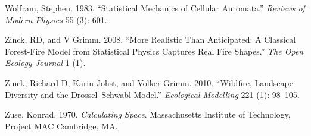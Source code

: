 \documentclass[
]{book}
\newlength{\cslhangindent}
\newenvironment{cslreferences}%
  {\setlength{\parindent}{0pt}%
  \everypar{\setlength{\hangindent}{\cslhangindent}}\ignorespaces}%
  {\par}
\begin{document}
\begin{cslreferences}
\leavevmode\hypertarget{ref-wolfram1983statistical}{}%
Wolfram, Stephen. 1983. ``Statistical Mechanics of Cellular Automata.'' \emph{Reviews of Modern Physics} 55 (3): 601.

\leavevmode\hypertarget{ref-zinck2008more}{}%
Zinck, RD, and V Grimm. 2008. ``More Realistic Than Anticipated: A Classical Forest-Fire Model from Statistical Physics Captures Real Fire Shapes.'' \emph{The Open Ecology Journal} 1 (1).

\leavevmode\hypertarget{ref-zinck2010wildfire}{}%
Zinck, Richard D, Karin Johst, and Volker Grimm. 2010. ``Wildfire, Landscape Diversity and the Drossel--Schwabl Model.'' \emph{Ecological Modelling} 221 (1): 98--105.

\leavevmode\hypertarget{ref-zuse1970calculating}{}%
Zuse, Konrad. 1970. \emph{Calculating Space}. Massachusetts Institute of Technology, Project MAC Cambridge, MA.
\end{cslreferences}
\end{document}
